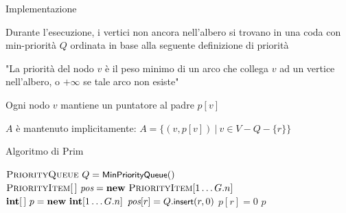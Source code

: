 \begin{frame}{Implementazione}

\vspace{-9pt}
\begin{myboxtitle}
\BI
\item Durante l'esecuzione, i vertici non ancora nell'albero si trovano in una 
coda con min-priorità $Q$ ordinata in base alla seguente definizione di priorità
\item "La priorità del nodo $v$ è il peso minimo di un arco che collega $v$ ad
un vertice nell'albero, o $+\infty$ se tale arco non esiste"
\EI
\end{myboxtitle}

\begin{myboxtitle}
\BI
\item Ogni nodo $v$ mantiene un puntatore al padre $p[v]$
\item $A$ è mantenuto implicitamente: $A = \{ (v, p[v]) ~|~ v \in V - Q - \{ r \} \}$
\EI
\end{myboxtitle}

\end{frame}



\begin{frame}[shrink=10]{Algoritmo di Prim}

\vspace{-12pt}
\begin{Procedure}
\caption[A]{$\INTARRAY\ \prim(\Graph\ G,\ \Node\ r)$}

$\textsc{PriorityQueue}\ Q = \textsf{{\small MinPriorityQueue}}()$\;
$\PriorityItem[\,]\ \Pos = \NEW\ \PriorityItem[1 \mldots G.n]$\;
$\INTARRAY\ p = \NEW\ \INTEGER[1 \mldots G.n]$\;
$\textit{pos}[r] = Q.\textsf{{\small insert}}(r, 0)$\;
$p[r] = 0$\;
\Return $p$\;
\end{Procedure}
\end{frame}

